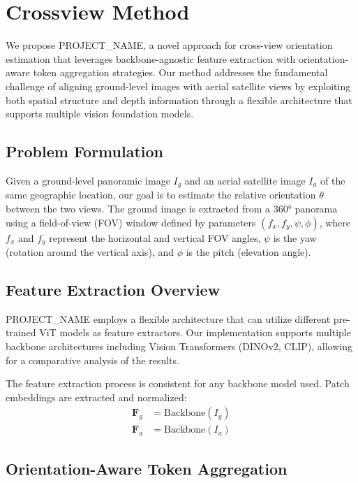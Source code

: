 \section{Crossview Method}
\label{sec:method}

We propose PROJECT\_NAME, a novel approach for cross-view orientation estimation that leverages backbone-agnostic feature extraction with orientation-aware token aggregation strategies. Our method addresses the fundamental challenge of aligning ground-level images with aerial satellite views by exploiting both spatial structure and depth information through a flexible architecture that supports multiple vision foundation models.

\subsection{Problem Formulation}

Given a ground-level panoramic image $I_g$ and an aerial satellite image $I_a$ of the same geographic location, our goal is to estimate the relative orientation $\theta$ between the two views. The ground image is extracted from a 360° panorama using a field-of-view (FOV) window defined by parameters $(f_x, f_y, \psi, \phi)$, where $f_x$ and $f_y$ represent the horizontal and vertical FOV angles, $\psi$ is the yaw (rotation around the vertical axis), and $\phi$ is the pitch (elevation angle).

\newpage
\subsection{Feature Extraction Overview}

PROJECT\_NAME employs a flexible architecture that can utilize different pre-trained ViT models as feature extractors. Our implementation supports multiple backbone architectures including Vision Transformers (DINOv2, CLIP), allowing for a comparative analysis of the results.

The feature extraction process is consistent for any backbone model used. Patch embeddings are extracted and normalized:
\begin{align}
\mathbf{F}_g &= \text{Backbone}(I_g) \\
\mathbf{F}_a &= \text{Backbone}(I_a) 
\end{align}

\subsection{Orientation-Aware Token Aggregation}


